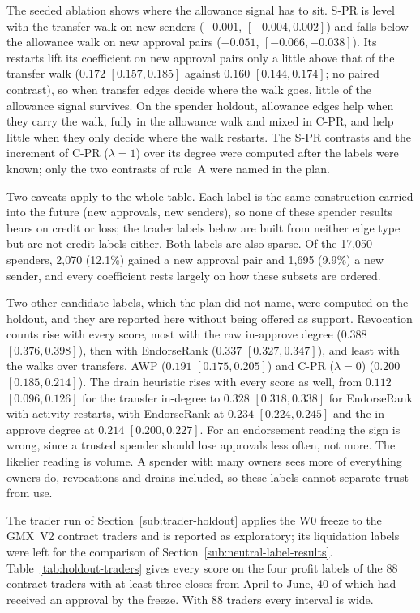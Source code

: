 The seeded ablation shows where the allowance signal has to sit. S-PR is level with the transfer walk on new senders ($-0.001$, $[-0.004,0.002]$) and falls below the allowance walk on new approval pairs ($-0.051$, $[-0.066,-0.038]$). Its restarts lift its coefficient on new approval pairs only a little above that of the transfer walk ($0.172$ $[0.157,0.185]$ against $0.160$ $[0.144,0.174]$; no paired contrast), so when transfer edges decide where the walk goes, little of the allowance signal survives. On the spender holdout, allowance edges help when they carry the walk, fully in the allowance walk and mixed in C-PR, and help little when they only decide where the walk restarts. The S-PR contrasts and the increment of C-PR ($\lambda=1$) over its degree were computed after the labels were known; only the two contrasts of rule~A were named in the plan.

Two caveats apply to the whole table. Each label is the same construction carried into the future (new approvals, new senders), so none of these spender results bears on credit or loss; the trader labels below are built from neither edge type but are not credit labels either. Both labels are also sparse. Of the 17,050 spenders, 2,070 (12.1\%) gained a new approval pair and 1,695 (9.9\%) a new sender, and every coefficient rests largely on how these subsets are ordered.

Two other candidate labels, which the plan did not name, were computed on the holdout, and they are reported here without being offered as support. Revocation counts rise with every score, most with the raw in-approve degree ($0.388$ $[0.376,0.398]$), then with EndorseRank ($0.337$ $[0.327,0.347]$), and least with the walks over transfers, AWP ($0.191$ $[0.175,0.205]$) and C-PR ($\lambda=0$) ($0.200$ $[0.185,0.214]$). The drain heuristic rises with every score as well, from $0.112$ $[0.096,0.126]$ for the transfer in-degree to $0.328$ $[0.318,0.338]$ for EndorseRank with activity restarts, with EndorseRank at $0.234$ $[0.224,0.245]$ and the in-approve degree at $0.214$ $[0.200,0.227]$. For an endorsement reading the sign is wrong, since a trusted spender should lose approvals less often, not more. The likelier reading is volume. A spender with many owners sees more of everything owners do, revocations and drains included, so these labels cannot separate trust from use.


The trader run of Section~\ref{sub:trader-holdout} applies the W0 freeze to the GMX~V2 contract traders and is reported as exploratory; its liquidation labels were left for the comparison of Section~\ref{sub:neutral-label-results}. Table~\ref{tab:holdout-traders} gives every score on the four profit labels of the 88 contract traders with at least three closes from April to June, 40 of which had received an approval by the freeze. With 88 traders every interval is wide.

